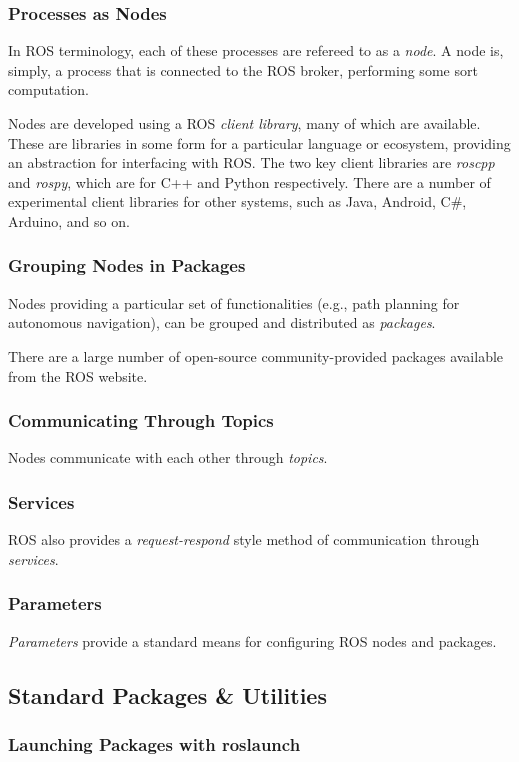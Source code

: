 \subsubsection{Processes as Nodes}
In ROS terminology, each of these processes are refereed to as a \emph{node}. A node is, simply, a process that is connected to the ROS broker, performing some sort computation.

Nodes are developed using a ROS \emph{client library}, many of which are available. These are libraries in some form for a particular language or ecosystem, providing an abstraction for interfacing with ROS. The two key client libraries are \emph{roscpp} and \emph{rospy}, which are for C++ and Python respectively. There are a number of experimental client libraries for other systems, such as Java, Android, C\#, Arduino, and so on.

\subsubsection{Grouping Nodes in Packages}
Nodes providing a particular set of functionalities (e.g., path planning for autonomous navigation), can be grouped and distributed as \emph{packages}.

There are a large number of open-source community-provided packages available from the ROS website.

\subsubsection{Communicating Through Topics}
Nodes communicate with each other through \emph{topics}.

\subsubsection{Services}
ROS also provides a \emph{request-respond} style method of communication through \emph{services}.

\subsubsection{Parameters}
\emph{Parameters} provide a standard means for configuring ROS nodes and packages.

\subsection{Standard Packages \& Utilities}
\subsubsection{Launching Packages with roslaunch}
